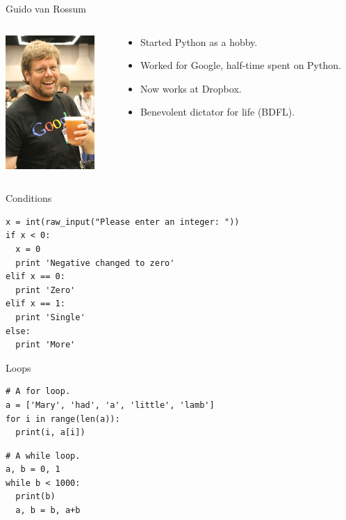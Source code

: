 \begin{frame}{Guido van Rossum}
  \begin{columns}
    \begin{column}{0.2\textwidth}
      \includegraphics[height=2in]{img/guido_van_rossum.jpg}
    \end{column}
    \begin{column}{0.6\textwidth}
      \begin{itemize}
    		\item Started Python as a hobby.
        \vspace{0.25cm}
    		\item Worked for Google, half-time spent on Python.
        \vspace{0.25cm}
    		\item Now works at Dropbox.
        \vspace{0.25cm}
        \item Benevolent dictator for life (BDFL).
      \end{itemize}
    \end{column}
  \end{columns}
\end{frame}

\begin{frame}[fragile]{Conditions}
  \begin{verbatim}
x = int(raw_input("Please enter an integer: "))
if x < 0:
  x = 0
  print 'Negative changed to zero'
elif x == 0:
  print 'Zero'
elif x == 1:
  print 'Single'
else:
  print 'More'
  \end{verbatim}
\end{frame}

\begin{frame}[fragile]{Loops}
  \begin{verbatim}
# A for loop.
a = ['Mary', 'had', 'a', 'little', 'lamb']
for i in range(len(a)):
  print(i, a[i])
  \end{verbatim}
  \begin{verbatim}
# A while loop.
a, b = 0, 1
while b < 1000:
  print(b)
  a, b = b, a+b
  \end{verbatim}
\end{frame}

